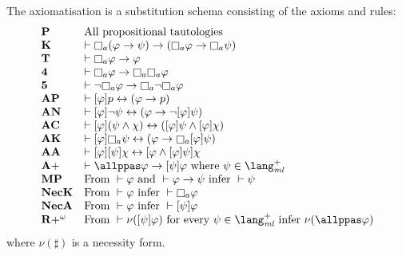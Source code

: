 \begin{definition}
    The axiomatisation \axiomPapalS{} is a substitution schema consisting of the axioms and rules:
    $$
    \begin{array}{ll}
        {\bf P} & \text{All propositional tautologies}\\
        {\bf K} & \proves \knows[\agentA] (\phi \implies \psi) \implies (\knows[\agentA] \phi \implies \knows[\agentA] \psi)\\
        {\bf T} & \proves \knows[\agentA] \phi \implies \phi\\
        {\bf 4} & \proves \knows[\agentA] \phi \implies \knows[\agentA] \knows[\agentA] \phi\\
        {\bf 5} & \proves \neg \knows[\agentA] \phi \implies \knows[\agentA] \neg \knows[\agentA] \phi\\
        {\bf AP} & \proves \announceA{\phi} \atomP \iff (\phi \implies \atomP)\\
        {\bf AN} & \proves \announceA{\phi} \neg \psi \iff (\phi \implies \neg \announceA{\phi} \psi)\\
        {\bf AC} & \proves \announceA{\phi} (\psi \land \chi) \iff (\announceA{\phi} \psi \land \announceA{\phi} \chi)\\
        {\bf AK} & \proves \announceA{\phi} \knows[\agentA] \psi \iff (\phi \implies \knows[\agentA] \announceA{\phi} \psi)\\
        {\bf AA} & \proves \announceA{\phi} \announceA{\psi} \chi \iff \announceA{\phi \land \announceA{\phi} \psi} \chi\\
        {\bf A+} & \proves \allppas \phi \implies \announceA{\psi} \phi \text{ where } \psi \in \langMlPlus\\
        {\bf MP} & \text{From } \proves \phi \text{ and } \proves \phi \implies \psi \text{ infer } \proves \psi\\
        {\bf NecK} & \text{From } \proves \phi \text{ infer } \proves \knows[\agentA] \phi\\
        {\bf NecA} & \text{From } \proves \phi \text{ infer } \proves \announceA{\psi} \phi\\
        {\bf R+^\omega} &\text{From } \proves \nu(\announceA{\psi} \phi) \text{ for every } \psi \in \langMlPlus \text{ infer } \nu(\allppas \phi)    \end{array}
    $$
    where $\nu(\sharp)$ is a necessity form.
\end{definition}

